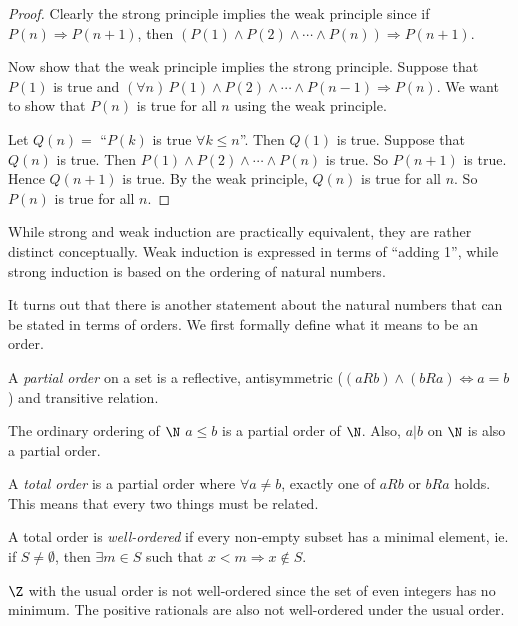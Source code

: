 \documentclass[a4paper]{article}
\begin{document}
\begin{proof}
  Clearly the strong principle implies the weak principle since if $P(n)\Rightarrow P(n + 1)$, then $(P(1)\wedge P(2)\wedge \cdots \wedge P(n))\Rightarrow P(n + 1)$.

  Now show that the weak principle implies the strong principle. Suppose that $P(1)$ is true and $(\forall n)\,P(1)\wedge P(2)\wedge \cdots \wedge P(n - 1)\Rightarrow P(n)$. We want to show that $P(n)$ is true for all $n$ using the weak principle.

  Let $Q(n) = $ ``$P(k)$ is true $\forall k\leq n$''. Then $Q(1)$ is true. Suppose that $Q(n)$ is true. Then $P(1)\wedge P(2)\wedge\cdots \wedge P(n)$ is true. So $P(n+1)$ is true. Hence $Q(n + 1)$ is true. By the weak principle, $Q(n)$ is true for all $n$. So $P(n)$ is true for all $n$.
\end{proof}
While strong and weak induction are practically equivalent, they are rather distinct conceptually. Weak induction is expressed in terms of ``adding 1'', while strong induction is based on the ordering of natural numbers.

It turns out that there is another statement about the natural numbers that can be stated in terms of orders. We first formally define what it means to be an order.

\begin{defi}
  A \emph{partial order} on a set is a reflective, antisymmetric ($(aRb) \wedge (bRa) \Leftrightarrow a = b$) and transitive relation.
\end{defi}

\begin{eg}
  The ordinary ordering of $\N$ $a\leq b$ is a partial order of $\N$. Also, $a|b$ on $\N$ is also a partial order.
\end{eg}

\begin{defi}
  A \emph{total order} is a partial order where $\forall a\not= b$, exactly one of $aRb$ or $bRa$ holds. This means that every two things must be related.
\end{defi}

\begin{defi}
  A total order is \emph{well-ordered} if every non-empty subset has a minimal element, ie. if $S\not= \emptyset$, then $\exists m\in S$ such that $x < m \Rightarrow x\not\in S$.
\end{defi}

\begin{eg}
  $\Z$ with the usual order is not well-ordered since the set of even integers has no minimum. The positive rationals are also not well-ordered under the usual order.
\end{eg}
\end{document}
